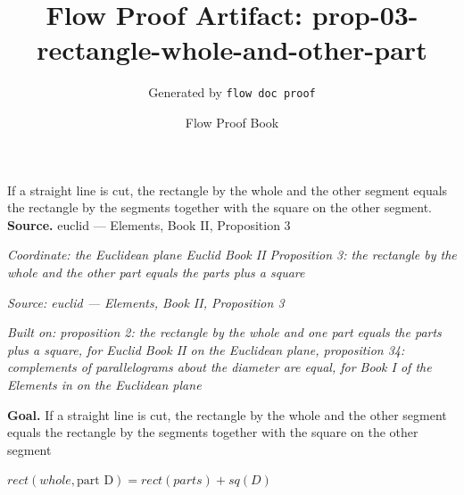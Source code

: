 \documentclass[11pt]{article}
\title{Flow Proof Artifact: prop-03-rectangle-whole-and-other-part}
\author{Generated by \texttt{flow doc proof}}
\date{Flow Proof Book}
\theoremstyle{definition}
\begin{document}
\maketitle
If a straight line is cut, the rectangle by the whole and the other segment equals the rectangle by the segments together with the square on the other segment.\\[0.5em]
\textbf{Source.} euclid — Elements, Book II, Proposition 3\\[0.5em]
\bigskip
{}\par
\smallskip\noindent\textit{Coordinate: the Euclidean plane \cdot Euclid Book II \cdot Proposition 3: the rectangle by the whole and the other part equals the parts plus a square}\par
\smallskip\noindent\textit{Source: euclid — Elements, Book II, Proposition 3}\par
\smallskip\noindent\textit{Built on: proposition 2: the rectangle by the whole and one part equals the parts plus a square, for Euclid Book II on the Euclidean plane, proposition 34: complements of parallelograms about the diameter are equal, for Book I of the Elements in on the Euclidean plane}\par
\medskip
\noindent\textbf{Goal.} If a straight line is cut, the rectangle by the whole and the other segment equals the rectangle by the segments together with the square on the other segment\par
\noindent$\displaystyle rect(whole, \text{part D}) = rect(parts) + sq(D)$\par
\medskip
\noindent
\end{document}
